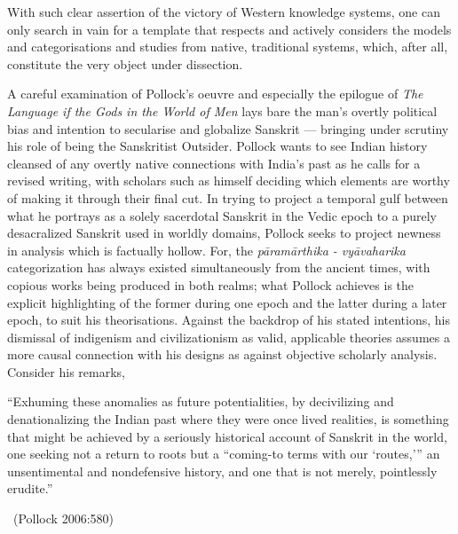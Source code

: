 With such clear assertion of the victory of Western knowledge systems, one can only search in vain for a template that respects and actively considers the models and categorisations and studies from native, traditional systems, which, after all, constitute the very object under dissection.

A careful examination of Pollock’s oeuvre and especially the epilogue of \textit{The Language if the Gods in the World of Men} lays bare the man’s overtly political bias and intention to secularise and globalize Sanskrit — bringing under scrutiny his role of being the Sanskritist Outsider. Pollock wants to see Indian history cleansed of any overtly native connections with India’s past as he calls for a revised writing, with scholars such as himself deciding which elements are worthy of making it through their final cut. In trying to project a temporal gulf between what he portrays as a solely sacerdotal Sanskrit in the Vedic epoch to a purely desacralized Sanskrit used in worldly domains, Pollock seeks to project newness in analysis which is factually hollow. For, the \textit{pāramārthika - vyāvaharika} categorization has always existed simultaneously from the ancient times, with copious works being produced in both realms; what Pollock achieves is the explicit highlighting of the former during one epoch and the latter during a later epoch, to suit his theorisations. Against the backdrop of his stated intentions, his dismissal of indigenism and civilizationism as valid, applicable theories assumes a more causal connection with his designs as against objective scholarly analysis. Consider his remarks,

\begin{myquote}
“Exhuming these anomalies as future potentialities, by decivilizing and denationalizing the Indian past where they were once lived realities, is something that might be achieved by a seriously historical account of Sanskrit in the world, one seeking not a return to roots but a “coming-to terms with our ‘routes,’” an unsentimental and nondefensive history, and one that is not merely, pointlessly erudite.” 

\vskip 3pt

~\hfill (Pollock 2006:580)
\end{myquote}

\vskip 4pt

